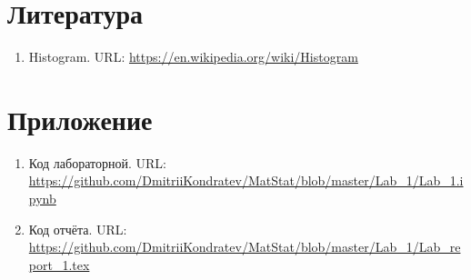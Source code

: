 \documentclass[12pt,a4paper]{article}
\begin{document}
\section{Литература}
	\begin{enumerate}
		\item \label{Histogram} Histogram. URL: \url{https://en.wikipedia.org/wiki/Histogram}
	\end{enumerate}
\section{Приложение}
	\begin{enumerate}
		\item \label{Code} Код лабораторной. URL: \url{https://github.com/DmitriiKondratev/MatStat/blob/master/Lab_1/Lab_1.ipynb}
		
		\item Код отчёта. URL: \url{https://github.com/DmitriiKondratev/MatStat/blob/master/Lab_1/Lab_report_1.tex}
		
	\end{enumerate}
\end{document}
